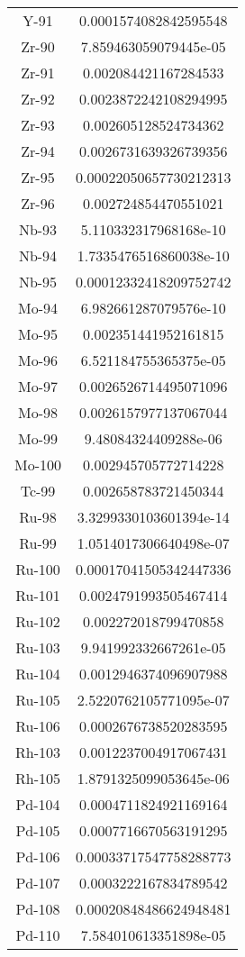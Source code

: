 \begin{table}[h!]
\begin{tabular}{|| c || c |}
Y-91 & 0.0001574082842595548 \\
Zr-90 & 7.859463059079445e-05 \\
Zr-91 & 0.002084421167284533 \\
Zr-92 & 0.0023872242108294995 \\
Zr-93 & 0.002605128524734362 \\
Zr-94 & 0.0026731639326739356 \\
Zr-95 & 0.00022050657730212313 \\
Zr-96 & 0.002724854470551021 \\
Nb-93 & 5.110332317968168e-10 \\
Nb-94 & 1.7335476516860038e-10 \\
Nb-95 & 0.00012332418209752742 \\
Mo-94 & 6.982661287079576e-10 \\
Mo-95 & 0.002351441952161815 \\
Mo-96 & 6.521184755365375e-05 \\
Mo-97 & 0.0026526714495071096 \\
Mo-98 & 0.0026157977137067044 \\
Mo-99 & 9.48084324409288e-06 \\
Mo-100 & 0.002945705772714228 \\
Tc-99 & 0.002658783721450344 \\
Ru-98 & 3.3299330103601394e-14 \\
Ru-99 & 1.0514017306640498e-07 \\
Ru-100 & 0.00017041505342447336 \\
Ru-101 & 0.0024791993505467414 \\
Ru-102 & 0.002272018799470858 \\
Ru-103 & 9.941992332667261e-05 \\
Ru-104 & 0.0012946374096907988 \\
Ru-105 & 2.5220762105771095e-07 \\
Ru-106 & 0.0002676738520283595 \\
Rh-103 & 0.0012237004917067431 \\
Rh-105 & 1.8791325099053645e-06 \\
Pd-104 & 0.0004711824921169164 \\
Pd-105 & 0.0007716670563191295 \\
Pd-106 & 0.00033717547758288773 \\
Pd-107 & 0.0003222167834789542 \\
Pd-108 & 0.00020848486624948481 \\
Pd-110 & 7.584010613351898e-05 \\

\end{tabular}
\end{table}
